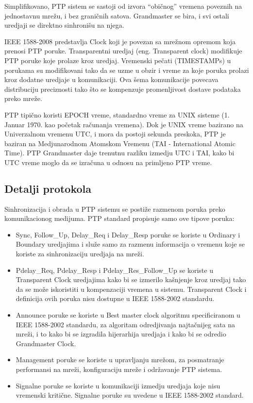 \documentclass[a4paper,12pt, master]{etf}
\begin{document}
    Simplifikovano, PTP sistem se sastoji od izvora ``obi\v{c}nog'' vremena
    poveznih na jednostavnu mre\v{z}u, i bez grani\v{c}nih satova. Grandmaster
    se bira, i svi ostali uredjaji se direktno sinhroni\v{s}u na njega.

	IEEE 1588-2008 predstavlja Clock koji je povezan sa mre\v{z}nom opremom
    koja prenosi PTP poruke.  Transparentni uredjaj (eng\@. Transparent clock)
	modifikuje PTP poruke koje prolaze kroz uredjaj. Vremenski pe\v{c}ati
	(TIMESTAMPs) u porukama su modifikovani tako da se uzme u obzir i vreme za
	koje poruka prolazi kroz dodatne uredjaje u komunikaciji. Ova \v{s}ema
	komunikacije povecava distribuciju preciznosti tako \v{s}to se kompenzuje
	promenljivost dostave podataka preko mre\v{z}e.

	PTP tipi\v{c}no koristi EPOCH vreme, standardno vreme za UNIX sisteme (1\@.
	Januar 1970\@. kao po\v{c}etak ra\v{c}unanja vremena). Dok je UNIX vreme
	bazirano na Univerzalnom vremenu UTC, i mora da postoji sekunda preskoka,
    PTP je baziran na Medjunarodnom Atomskom Vremenu (TAI - International Atomic
    Time). PTP Grandmaster daje trenutnu razliku izmedju UTC i TAI, kako bi UTC
    vreme moglo da se izra\v{c}una u odnosu na primljeno PTP vreme.

	\subsection{Detalji protokola}

	Sinhronizacija i obrada u PTP sistemu se posti\v{z}e razmenom poruka preko
	komunikacionog medijuma. PTP standard propisuje samo ove tipove poruka:

	\begin{itemize}
		\item Sync, Follow\_Up, Delay\_Req i Delay\_Resp poruke se koriste u
		Ordinary i Boundary uredjajima i slu\v{z}e samo za razmenu informacija
		o vremenu koje se koriste za sinhronizaciju uredjaja na mre\v{z}i.
		\item Pdelay\_Req, Pdelay\_Resp i Pdelay\_Res\_Follow\_Up se koriste u
		Tra\-nsparent Clock uredjajima kako bi se izmerilo ka\v{s}njenje kroz
        uredjaj tako da se mo\v{z}e iskoristiti u kompenzaciji vremena u
        sistemu. Transparent Clock i definicija ovih poruka nisu dostupne u
        IEEE 1588-2002 standardu.
        \item Announce poruke se koriste u Best master clock algoritmu
        specificiranom u IEEE 1588-2002 standardu, za algoritam odredjivanja
        najta\v{c}nijeg sata na mre\v{z}i, i to kako bi se izgradila hijerarhija
        uredjaja i kako bi se odredio Grandmaster Clock.
		\item Management poruke se koriste u upravljanju mre\v{z}om, za
		posmatranje performansi na mre\v{z}i, konfiguraciju mre\v{z}e i
		odr\v{z}avanje PTP sistema.
		\item Signalne poruke se koriste u komunikaciji izmedju uredjaja koje
		nisu vremenski kriti\v{c}ne. Signalne poruke su uvedene u IEEE
		1588-2002 standard.
	\end{itemize}
\end{document}
